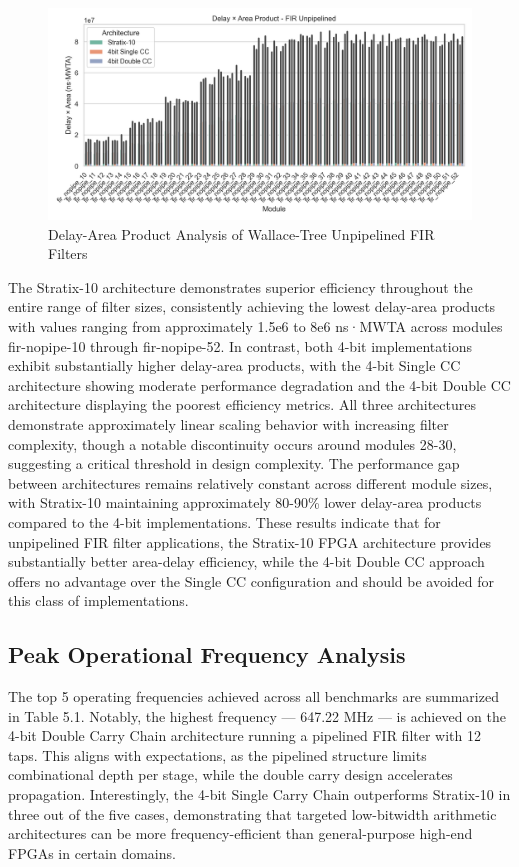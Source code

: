 \begin{figure}[H]
	\centerline{\includegraphics[scale = 0.75]{Figures/fir_unpipelined_wallace_delay_area_prod_plt.png}}
	\caption{Delay-Area Product Analysis of Wallace-Tree Unpipelined FIR Filters}
	\label{fig:Delay-Area Product Analysis of Wallace-Tree Unpipelined FIR Filters}
\end{figure}

The Stratix-10 architecture demonstrates superior efficiency throughout the entire range of filter sizes, consistently achieving the lowest delay-area products with values ranging from approximately 1.5e6 to 8e6 ns·MWTA across modules fir-nopipe-10 through fir-nopipe-52. In contrast, both 4-bit implementations exhibit substantially higher delay-area products, with the 4-bit Single CC architecture showing moderate performance degradation and the 4-bit Double CC architecture displaying the poorest efficiency metrics. All three architectures demonstrate approximately linear scaling behavior with increasing filter complexity, though a notable discontinuity occurs around modules 28-30, suggesting a critical threshold in design complexity. The performance gap between architectures remains relatively constant across different module sizes, with Stratix-10 maintaining approximately 80-90\% lower delay-area products compared to the 4-bit implementations. These results indicate that for unpipelined FIR filter applications, the Stratix-10 FPGA architecture provides substantially better area-delay efficiency, while the 4-bit Double CC approach offers no advantage over the Single CC configuration and should be avoided for this class of implementations.

\subsection{Peak Operational Frequency Analysis}
The top 5 operating frequencies achieved across all benchmarks are summarized in Table 5.1. Notably, the highest frequency — 647.22 MHz — is achieved on the 4-bit Double Carry Chain architecture running a pipelined FIR filter with 12 taps. This aligns with expectations, as the pipelined structure limits combinational depth per stage, while the double carry design accelerates propagation. Interestingly, the 4-bit Single Carry Chain outperforms Stratix-10 in three out of the five cases, demonstrating that targeted low-bitwidth arithmetic architectures can be more frequency-efficient than general-purpose high-end FPGAs in certain domains.

